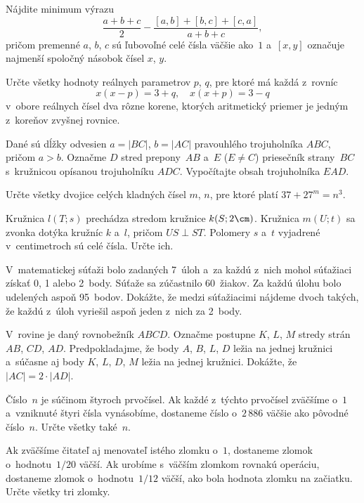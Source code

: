 {%
Nájdite minimum výrazu
$$
\frac{a+b+c}{2}-\frac{[a,b]+[b,c]+[c,a]}{a+b+c},
$$
pričom premenné $a$, $b$, $c$ sú ľubovoľné celé čísla väčšie ako~$1$
a~$[x,y]$ označuje najmenší spoločný násobok čísel $x$, $y$.}

{%
Určte všetky hodnoty reálnych parametrov $p$, $q$, pre ktoré má každá z~rovníc
$$
x(x-p)=3+q, \quad x(x+p)=3-q
$$
v~obore reálnych čísel dva rôzne korene, ktorých aritmetický priemer je jedným z~koreňov zvyšnej rovnice.}

{%
Dané sú dĺžky odvesien $a=|BC|$, $b=|AC|$ pravouhlého trojuholníka $ABC$,
pričom $a>b$. Označme $D$ stred prepony~$AB$ a~$E$ ($E\ne C$) priesečník strany~$BC$ s~kružnicou
opísanou trojuholníku $ADC$. Vypočítajte obsah trojuholníka $EAD$.}

{%
Určte všetky dvojice celých kladných čísel $m$, $n$, pre ktoré platí $37+27^m=n^3$.}

{%
Kružnica $l(T;s)$ prechádza stredom kružnice $k(S;2\cm)$. Kružnica $m(U;t)$ sa zvonka dotýka kružníc $k$ a~$l$, pričom $US\perp ST$. Polomery $s$ a~$t$ vyjadrené v~centimetroch sú celé čísla. Určte ich.
}

{%
V~matematickej súťaži bolo zadaných 7~úloh a~za každú z~nich mohol súťažiaci získať 0, 1 alebo 2~body. Súťaže sa zúčastnilo 60~žiakov. Za každú úlohu bolo udelených aspoň 95~bodov. Dokážte, že medzi súťažiacimi nájdeme dvoch takých, že každú z~úloh vyriešil aspoň jeden z~nich za 2~body.
}

{%
V~rovine je daný rovnobežník $ABCD$. Označme postupne $K$, $L$, $M$ stredy strán $AB$, $CD$, $AD$. Predpokladajme, že body
$A$, $B$, $L$, $D$ ležia na jednej kružnici a~súčasne aj body $K$, $L$, $D$, $M$ ležia na jednej kružnici. Dokážte, že $|AC|=2\cdot|AD|$.
}

{%
Číslo~$n$ je súčinom štyroch prvočísel. Ak každé z~týchto prvočísel zväčšíme o~$1$ a~vzniknuté štyri čísla vynásobíme, dostaneme číslo o~$2\,886$ väčšie ako pôvodné číslo~$n$. Určte všetky také~$n$.
}

{%
Ak zväčšíme čitateľ aj menovateľ istého zlomku o~$1$, dostaneme zlomok o~hodnotu~$1/20$ väčší.
Ak urobíme s~väčším zlomkom rovnakú operáciu, dostaneme zlomok o~hodnotu~$1/12$ väčší,
ako bola hodnota zlomku na začiatku. Určte všetky tri zlomky.}

